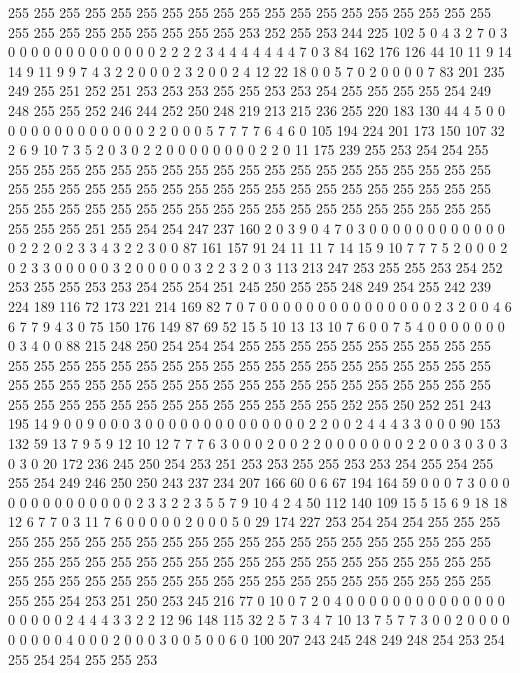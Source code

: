 255 255 255 255 255 255 255 255 255 255 255 255 255 255 255 255 255 255 255 255
255 255 255 255 255 255 255 255 253 252 255 253 244 225 102 5 0 4 3 2
7 0 3 0 0 0 0 0 0 0 0 0 0 0 0 0 2 2 2 2
3 4 4 4 4 4 4 4 7 0 3 84 162 176 126 44 10 11 9 14
14 9 11 9 9 7 4 3 2 2 0 0 0 2 3 2 0 0 2 4
12 22 18 0 0 5 7 0 2 0 0 0 0 7 83 201 235 249 255 251
252 251 253 253 253 255 255 253 253 254 255 255 255 255 254 249 248 255 255 252
246 244 252 250 248 219 213 215 236 255 220 183 130 44 4 5 0 0 0 0
0 0 0 0 0 0 0 0 0 0 2 2 0 0 0 5 7 7 7 7
6 4 6 0 105 194 224 201 173 150 107 32 2 6 9 10 7 3 5 2
0 3 0 2 2 0 0 0 0 0 0 0 0 2 2 0 11 175 239 255
253 254 254 255 255 255 255 255 255 255 255 255 255 255 255 255 255 255 255 255
255 255 255 255 255 255 255 255 255 255 255 255 255 255 255 255 255 255 255 255
255 255 255 255 255 255 255 255 255 255 255 255 255 255 255 255 255 255 255 255
255 255 255 255 251 255 254 254 247 237 160 2 0 3 9 0 4 7 0 3
0 0 0 0 0 0 0 0 0 0 0 0 0 2 2 2 0 2 3 3
4 3 2 2 3 0 0 87 161 157 91 24 11 11 7 14 15 9 10 7
7 7 5 2 0 0 0 2 0 2 3 3 0 0 0 0 0 3 2 0
0 0 0 0 3 2 2 3 2 0 3 113 213 247 253 255 255 253 254 252
253 255 255 253 253 254 255 254 251 245 250 255 255 248 249 254 255 242 239 224
189 116 72 173 221 214 169 82 7 0 7 0 0 0 0 0 0 0 0 0
0 0 0 0 0 0 2 3 2 0 0 4 6 6 7 7 9 4 3 0
75 150 176 149 87 69 52 15 5 10 13 13 10 7 6 0 0 7 5 4
0 0 0 0 0 0 0 0 3 4 0 0 88 215 248 250 254 254 254 255
255 255 255 255 255 255 255 255 255 255 255 255 255 255 255 255 255 255 255 255
255 255 255 255 255 255 255 255 255 255 255 255 255 255 255 255 255 255 255 255
255 255 255 255 255 255 255 255 255 255 255 255 255 255 255 255 255 255 255 255
252 255 250 252 251 243 195 14 9 0 0 9 0 0 0 3 0 0 0 0
0 0 0 0 0 0 0 0 0 0 2 2 0 0 2 4 4 4 3 3
0 0 0 90 153 132 59 13 7 9 5 9 12 10 12 7 7 7 6 3
0 0 0 2 0 0 2 2 0 0 0 0 0 0 0 2 2 0 0 3
0 3 0 3 0 3 0 20 172 236 245 250 254 253 251 253 253 255 255 253
253 254 255 254 255 255 254 249 246 250 250 243 237 234 207 166 60 0 6 67
194 164 59 0 0 0 7 3 0 0 0 0 0 0 0 0 0 0 0 0
0 0 2 3 3 2 2 3 5 5 7 9 10 4 2 4 50 112 140 109
15 5 15 6 9 18 18 12 6 7 7 0 3 11 7 6 0 0 0 0
0 2 0 0 0 5 0 29 174 227 253 254 254 254 255 255 255 255 255 255
255 255 255 255 255 255 255 255 255 255 255 255 255 255 255 255 255 255 255 255
255 255 255 255 255 255 255 255 255 255 255 255 255 255 255 255 255 255 255 255
255 255 255 255 255 255 255 255 255 255 255 255 255 255 255 255 254 253 251 250
253 245 216 77 0 10 0 7 2 0 4 0 0 0 0 0 0 0 0 0
0 0 0 0 0 0 0 0 0 0 2 4 4 4 3 3 2 2 12 96
148 115 32 2 5 7 3 4 7 10 13 7 5 7 7 3 0 0 2 0
0 0 0 0 0 0 0 0 4 0 0 0 2 0 0 0 3 0 0 5
0 0 6 0 100 207 243 245 248 249 248 254 253 254 255 254 254 255 255 253
